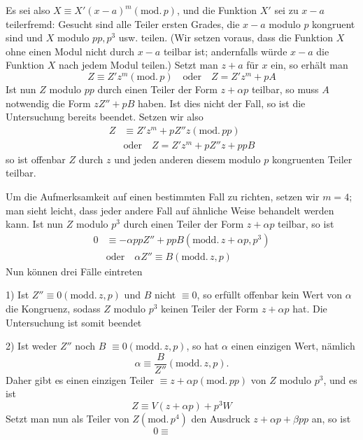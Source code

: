 Es sei also $X\equiv X'(x-a)^m(\mathrm{mod.}\,p)$, und die Funktion $X'$ sei zu \mbox{$x-a$} teilerfremd: Gesucht sind alle Teiler ersten Grades, die $x-a$ modulo $p$ kongruent sind und $X$ modulo $pp,p^3$ usw. teilen. (Wir setzen voraus, dass die Funktion $X$ ohne einen Modul nicht durch $x-a$ teilbar ist; andernfalls würde $x-a$ die Funktion $X$ nach jedem Modul teilen.) Setzt man $z+a$ für $x$ ein, so erhält man
\[
Z\equiv Z'z^m(\mathrm{mod.}\,p)\quad\text{oder}\quad Z=Z'z^m+pA
\]
Ist nun $Z$ modulo $pp$ durch einen Teiler der Form $z+\alpha p$ teilbar, so muss $A$ notwendig die Form $zZ''+pB$ haben. Ist dies nicht der Fall, so ist die Untersuchung bereits beendet. Setzen wir also
\[
\begin{aligned}
Z&\equiv Z'z^m+pZ''z(\mathrm{mod.}\,pp)\\
&\text{oder}\quad Z=Z'z^m+pZ''z+ppB
\end{aligned}
\]
so ist offenbar $Z$ durch $z$ und jeden anderen diesem modulo $p$ kongruenten Teiler teilbar.

Um die Aufmerksamkeit auf einen bestimmten Fall zu richten, setzen wir $m=4$; man sieht leicht, dass jeder andere Fall auf ähnliche Weise behandelt werden kann. Ist nun $Z$ modulo $p^3$ durch einen Teiler der Form $z+\alpha p$ teilbar, so ist
\[
\begin{aligned}
0&\equiv-\alpha ppZ''+ppB(\mathrm{modd.}\,z+\alpha p,p^3)\\
&\text{oder}\quad\alpha Z''\equiv B(\mathrm{modd.}\,z,p)
\end{aligned}
\]
Nun können drei Fälle eintreten

1) Ist $Z''\equiv0(\mathrm{modd.}\,z,p)$ und $B$ nicht $\equiv0$, so erfüllt offenbar kein Wert von $\alpha$ die Kongruenz, sodass $Z$ modulo $p^3$ keinen Teiler der Form $z+\alpha p$ hat. Die Untersuchung ist somit beendet

2) Ist weder $Z''$ noch $B$ $\equiv0(\mathrm{modd.}\,z,p)$, so hat $\alpha$ einen einzigen Wert, nämlich
\[
\alpha\equiv\frac B{Z''}(\mathrm{modd.}\,z,p).
\]
Daher gibt es einen einzigen Teiler $\equiv z+\alpha p(\mathrm{mod.}\,pp)$ von $Z$ modulo $p^3$, und es ist
\[
Z\equiv V(z+\alpha p)+p^3W
\]
Setzt man nun als Teiler von $Z(\mathrm{mod.}\,p^4)$ den Ausdruck $z+\alpha p+\beta pp$ an, so ist
\[
0\equiv\qquad\qquad
\]
